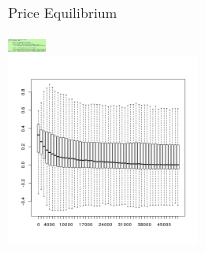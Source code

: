 \documentclass[final]{beamer}
\begin{document}
\begin{frame}
\begin{columns}
\begin{block}{Price Equilibrium}
\begin{center}
				\includegraphics[width=1cm]{./codeNeeds.png}\\
				\includegraphics[width=5cm]{./NonEquilibrium.png}
			\end{center}


		\end{block}


\end{columns}
\end{frame}
\end{document}
